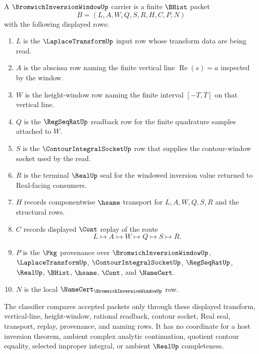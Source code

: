\begin{definition}
\label{def:bromwich-inversion-window-carrier}
A $\BromwichInversionWindowUp$ carrier is a finite $\BHist$ packet
$$
B=(L,A,W,Q,S,R,H,C,P,N)
$$
with the following displayed rows:
\begin{enumerate}
\item $L$ is the $\LaplaceTransformUp$ input row whose transform data are being read.
\item $A$ is the abscissa row naming the finite vertical line $\operatorname{Re}(s)=a$ inspected by the window.
\item $W$ is the height-window row naming the finite interval $[-T,T]$ on that vertical line.
\item $Q$ is the $\RegSeqRatUp$ readback row for the finite quadrature samples attached to $W$.
\item $S$ is the $\ContourIntegralSocketUp$ row that supplies the contour-window socket used by the read.
\item $R$ is the terminal $\RealUp$ seal for the windowed inversion value returned to Real-facing consumers.
\item $H$ records componentwise $\hsame$ transport for $L,A,W,Q,S,R$ and the structural rows.
\item $C$ records displayed $\Cont$ replay of the route
$$
L \longmapsto A \longmapsto W \longmapsto Q \longmapsto S \longmapsto R .
$$
\item $P$ is the $\Pkg$ provenance over $\BromwichInversionWindowUp$, $\LaplaceTransformUp$, $\ContourIntegralSocketUp$, $\RegSeqRatUp$, $\RealUp$, $\BHist$, $\hsame$, $\Cont$, and $\NameCert$.
\item $N$ is the local $\NameCert_{\BromwichInversionWindowUp}$ row.
\end{enumerate}
The classifier compares accepted packets only through these displayed transform, vertical-line, height-window, rational readback, contour socket, Real seal, transport, replay, provenance, and naming rows. It has no coordinate for a host inversion theorem, ambient complex analytic continuation, quotient contour equality, selected improper integral, or ambient $\RealUp$ completeness.
\end{definition}

